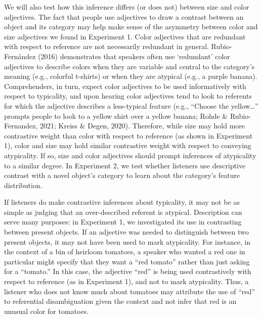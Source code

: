 \documentclass[
  english,
  man,floatsintext]{apa6}
\begin{document}
We will also test how this inference differs (or does not) between size and color adjectives. The fact that people use adjectives to draw a contrast between an object and its category may help make sense of the asymmetry between color and size adjectives we found in Experiment 1. Color adjectives that are redundant with respect to reference are not necessarily redundant in general. Rubio-Fernández (2016) demonstrates that speakers often use `redundant' color adjectives to describe colors when they are variable and central to the category's meaning (e.g., colorful t-shirts) or when they are atypical (e.g., a purple banana). Comprehenders, in turn, expect color adjectives to be used informatively with respect to typicality, and upon hearing color adjectives tend to look to referents for which the adjective describes a less-typical feature (e.g., ``Choose the yellow\ldots'' prompts people to look to a yellow shirt over a yellow banana; Rohde \& Rubio-Fernandez, 2021; Kreiss \& Degen, 2020). Therefore, while size may hold more contrastive weight than color with respect to reference (as shown in Experiment 1), color and size may hold similar contrastive weight with respect to conveying atypicality. If so, size and color adjectives should prompt inferences of atypicality to a similar degree. In Experiment 2, we test whether listeners use descriptive contrast with a novel object's category to learn about the category's feature distribution.

If listeners do make contrastive inferences about typicality, it may not be as simple as judging that an over-described referent is atypical. Description can serve many purposes: in Experiment 1, we investigated its use in contrasting between present objects. If an adjective was needed to distinguish between two present objects, it may not have been used to mark atypicality. For instance, in the context of a bin of heirloom tomatoes, a speaker who wanted a red one in particular might specify that they want a ``red tomato'' rather than just asking for a ``tomato.'' In this case, the adjective ``red'' is being used contrastively with respect to reference (as in Experiment 1), and not to mark atypicality. Thus, a listener who does not know much about tomatoes may attribute the use of ``red'' to referential disambiguation given the context and not infer that red is an unusual color for tomatoes.
\end{document}
